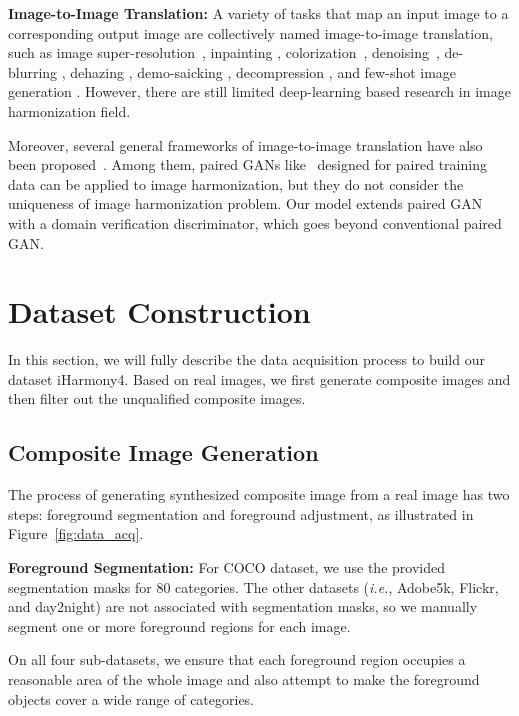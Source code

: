 \documentclass[10pt,twocolumn,letterpaper]{article}
\begin{document}
\textbf{Image-to-Image Translation: }A variety of tasks that map an input image to a corresponding output image are collectively named image-to-image translation, such as image super-resolution~\cite{kim2016super-res,kim2016super-res_recursive,ledig2017super-resolution-gan}, inpainting \cite{inpainting,zhang2019GAIN}, colorization~\cite{zhang2016colorful,larsson2016colorization}, denoising~\cite{image-denoising}, de-blurring \cite{deblurring}, dehazing \cite{ren2016dehaze,dehazeNet}, demo-saicking \cite{demosaicking}, decompression \cite{dong2015compression}, and few-shot image generation \cite{fewshotimage2020}. However, there are still limited deep-learning based research in image harmonization field.

Moreover, several general frameworks of image-to-image translation have also been proposed~\cite{pixelGAN,cGAN,zhang2019multi}. Among them, paired GANs like~\cite{pixelGAN} designed for paired training data can be applied to image harmonization, but they do not consider the uniqueness of image harmonization problem. Our model extends paired GAN with a domain verification discriminator, which goes beyond conventional paired GAN.


\section{Dataset Construction} \label{sec:data_cons}
In this section, we will fully describe the data acquisition process to build our dataset iHarmony4. Based on real images, we first generate composite images and then filter out the unqualified composite images.

\subsection{Composite Image Generation}\label{sec:syn_img_gen}

The process of generating synthesized composite image from a real image has two steps: foreground segmentation and foreground adjustment, as illustrated in Figure~\ref{fig:data_acq}.

\noindent\textbf{Foreground Segmentation: }For COCO dataset, we use the provided segmentation masks for $80$ categories. The other datasets (\emph{i.e.}, Adobe5k, Flickr, and day2night) are not associated with segmentation masks, so we manually segment one or more foreground regions for each image. 

On all four sub-datasets, we ensure that each foreground region occupies a reasonable area of the whole image and also attempt to make the foreground objects cover a wide range of categories.
\end{document}
